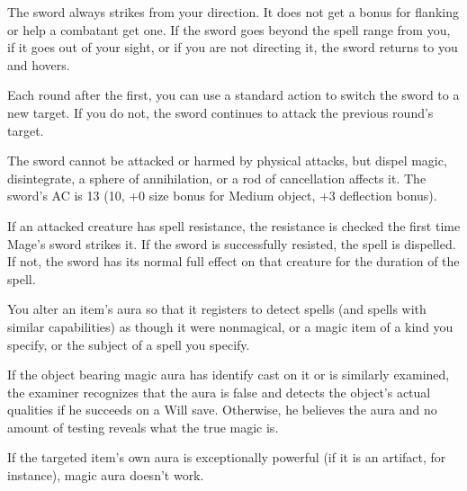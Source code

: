 \begin{multicols}{2}
\begin{small}
\smallskip\noindent The sword always strikes from your direction. It does not get a bonus for flanking or help a combatant get one. If the sword goes beyond the spell range from you, if it goes out of your sight, or if you are not directing it, the sword returns to you and hovers.

\smallskip\noindent Each round after the first, you can use a standard action to switch the sword to a new target. If you do not, the sword continues to attack the previous round's target.

\smallskip\noindent The sword cannot be attacked or harmed by physical attacks, but dispel magic, disintegrate, a sphere of annihilation, or a rod of cancellation affects it. The sword's AC is 13 (10, +0 size bonus for Medium object, +3 deflection bonus).

\smallskip\noindent If an attacked creature has spell resistance, the resistance is checked the first time Mage's sword strikes it. If the sword is successfully resisted, the spell is dispelled. If not, the sword has its normal full effect on that creature for the duration of the spell.


\noindent You alter an item's aura so that it registers to detect spells (and spells with similar capabilities) as though it were nonmagical, or a magic item of a kind you specify, or the subject of a spell you specify. 

\smallskip\noindent If the object bearing magic aura has identify cast on it or is similarly examined, the examiner recognizes that the aura is false and detects the object's actual qualities if he succeeds on a Will save. Otherwise, he believes the aura and no amount of testing reveals what the true magic is.

\smallskip\noindent If the targeted item's own aura is exceptionally powerful (if it is an artifact, for instance), magic aura doesn't work.



\end{small}
\end{multicols}
